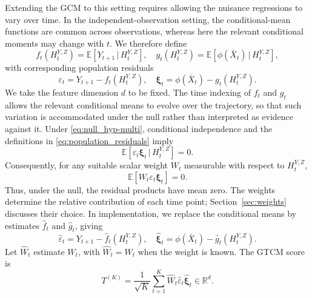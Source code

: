 \documentclass[12pt]{article}
\def\E{\mathbb{E}}
\newcommand\given{\,|\,}
\numberwithin{equation}{section}
\begin{document}
Extending the GCM to this setting requires allowing the nuisance regressions to vary over time. In the independent-observation setting, the conditional-mean functions are common across observations, whereas here the relevant conditional moments may change with \(t\). We therefore define
\begin{equation}
f_t(H_t^{Y,Z})
=
\E[Y_{t+1}\given H_t^{Y,Z}],
\quad
g_t(H_t^{Y,Z})
=
\E[\phi(\bar X_t)\given H_t^{Y,Z}],
\label{eq:time_indexed_nuisances}
\end{equation}
with corresponding population residuals
\begin{equation}
\varepsilon_t
=
Y_{t+1}-f_t(H_t^{Y,Z}),
\quad
\boldsymbol{\xi}_t
=
\phi(\bar X_t)-g_t(H_t^{Y,Z}).
\label{eq:population_residuals}
\end{equation}
We take the feature dimension \(d\) to be fixed. The time indexing of \(f_t\) and \(g_t\) allows the relevant conditional means to evolve over the trajectory, so that such variation is accommodated under the null rather than interpreted as evidence against it.
Under \eqref{eq:null_hyp-multi}, conditional independence and the definitions
in \eqref{eq:population_residuals} imply
$$
    \E[
        \varepsilon_t\boldsymbol{\xi}_t
        \given H_t^{Y,Z}]
    =0.
$$
Consequently, for any suitable scalar weight \(W_t\) measurable with respect
to \(H_t^{Y,Z}\),
\begin{equation}
    \E\!\left[
        W_t\varepsilon_t\boldsymbol{\xi}_t
    \right]
    =0.
    \label{eq:vector_moment}
\end{equation}
Thus, under the null, the residual products have mean zero.
The weights determine the relative contribution of each time point;
Section~\ref{sec:weights} discusses their choice. In implementation, we replace the conditional means by estimates $\hat f_t$ and $\hat g_t$, giving
\begin{equation}
    \hat\varepsilon_t
    =
    Y_{t+1}-\hat f_t(H_t^{Y,Z}),
    \quad
    \hat{\boldsymbol{\xi}}_t
    =
    \phi(\bar X_t)-\hat g_t(H_t^{Y,Z}).
    \label{eq:estimated_residuals}
\end{equation}
Let \(\hat W_t\) estimate \(W_t\), with \(\hat W_t=W_t\)
when the weight is known. The GTCM score is
\begin{equation}
    T^{(K)}
    =
    \frac{1}{\sqrt K}
    \sum_{t=1}^K
    \hat W_t
    \hat\varepsilon_t
    \hat{\boldsymbol{\xi}}_t
    \in\mathbb R^d.
    \label{eq:vector_score}
\end{equation}
\end{document}
